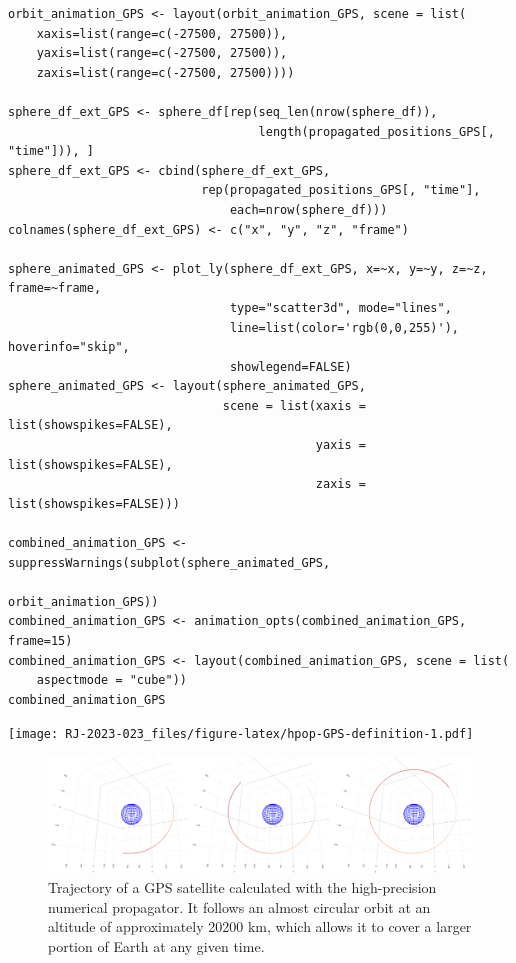 \begin{verbatim}
orbit_animation_GPS <- layout(orbit_animation_GPS, scene = list(
    xaxis=list(range=c(-27500, 27500)),
    yaxis=list(range=c(-27500, 27500)),
    zaxis=list(range=c(-27500, 27500))))

sphere_df_ext_GPS <- sphere_df[rep(seq_len(nrow(sphere_df)), 
                                   length(propagated_positions_GPS[, "time"])), ]
sphere_df_ext_GPS <- cbind(sphere_df_ext_GPS, 
                           rep(propagated_positions_GPS[, "time"],
                               each=nrow(sphere_df)))
colnames(sphere_df_ext_GPS) <- c("x", "y", "z", "frame")

sphere_animated_GPS <- plot_ly(sphere_df_ext_GPS, x=~x, y=~y, z=~z, frame=~frame, 
                               type="scatter3d", mode="lines", 
                               line=list(color='rgb(0,0,255)'), hoverinfo="skip",
                               showlegend=FALSE)
sphere_animated_GPS <- layout(sphere_animated_GPS,
                              scene = list(xaxis = list(showspikes=FALSE), 
                                           yaxis = list(showspikes=FALSE),
                                           zaxis = list(showspikes=FALSE)))

combined_animation_GPS <- suppressWarnings(subplot(sphere_animated_GPS,
                                                   orbit_animation_GPS))
combined_animation_GPS <- animation_opts(combined_animation_GPS, frame=15)
combined_animation_GPS <- layout(combined_animation_GPS, scene = list(
    aspectmode = "cube"))
combined_animation_GPS
\end{verbatim}

\texttt{[image: RJ-2023-023\_files/figure-latex/hpop-GPS-definition-1.pdf]}

\begin{figure}[H]

{\centering \includegraphics[width=0.99\linewidth]{static/GPS_static} 

}

\caption{Trajectory of a GPS satellite calculated with the high-precision numerical propagator. It follows an almost circular orbit at an altitude of approximately 20200 km, which allows it to cover a larger portion of Earth at any given time.}\label{fig:hpop-GPS-figure-static}
\end{figure}


